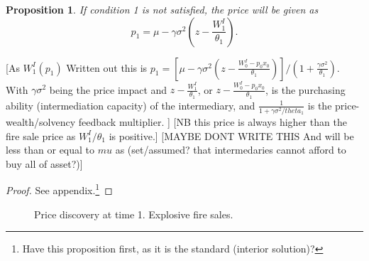 \documentclass[11pt]{article}
\newtheorem{proposition}{Proposition}
\begin{document}
\begin{proposition} \label{p_pricewoExplosive}
If condition 1 is not satisfied, the price will be given as 
\begin{equation}
p_1 = \mu - \gamma\sigma^2 \left(z-\frac{W^I_1}{\theta_1}\right).
\end{equation}
\end{proposition}
[As $W_1^I(p_1)$ Written out this is $p_1 = \left[\mu - \gamma\sigma^2 \left(z - \frac{W_0^I - p_0 x_0}{\theta_1}\right)\right]/(1+\frac{\gamma\sigma^2}{\theta_1}) $. With $\gamma\sigma^2$ being the price impact and $z-\frac{W^I_1}{\theta_1}$, or $z - \frac{W_0^I - p_0 x_0}{\theta_1}$, is the purchasing ability (intermediation capacity) of the intermediary, and $\frac{1}{1 + \gamma\sigma^2/theta_1}$ is the price-wealth/solvency feedback multiplier. ] [NB this price is always higher than the fire sale price as $W^I_1/\theta_1$ is positive.] [MAYBE DONT WRITE THIS And will be less than or equal to $mu$ as (set/assumed? that intermedaries cannot afford to buy all of asset?)]
\begin{proof}
See appendix.\footnote{Have this proposition first, as it is the standard (interior solution)?}
\end{proof}

\begin{figure}[h]
\centering
{}
\caption{Price discovery at time 1. Explosive fire sales.}
\label{fig:t1explosiveFS}
\end{figure}
\end{document}
